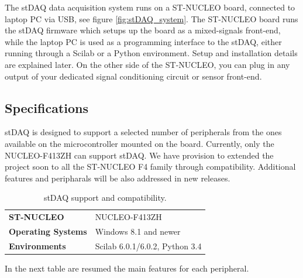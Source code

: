 \documentclass[letterpaper,10pt,english]{hitec}
\begin{document}
The stDAQ data acquisition system runs on a ST-NUCLEO board, connected to laptop PC via USB, see figure \ref{fig:stDAQ_system}. The ST-NUCLEO board runs the stDAQ firmware which setups up the board as a mixed-signals front-end, while the laptop PC is used as a programming interface to the stDAQ, either running through a Scilab or a Python environment. Setup and installation details are explained later. On the other side of the ST-NUCLEO, you can plug in any output of your dedicated signal conditioning circuit or sensor front-end.







\subsection{Specifications}

stDAQ is designed to support a selected number of peripherals from the ones available on the microcontroller mounted on the board. Currently, only the NUCLEO-F413ZH can support stDAQ. We have provision to extended the project soon to all the ST-NUCLEO F4 family through compatibility. Additional features and peripharals will be also addressed in new releases.

\begin{table}[h!]
\caption{stDAQ support and compatibility.}
\centering
\begin{tabular}{|ll|}
\textbf{ST-NUCLEO} & NUCLEO-F413ZH  \\
\textbf{Operating Systems} & Windows 8.1 and newer \\ 
\textbf{Environments} & Scilab 6.0.1/6.0.2, Python 3.4 
\end{tabular}
\end{table}

In the next table are resumed the main features for each peripheral.
\end{document}
